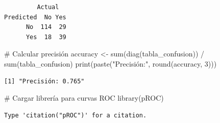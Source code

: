 \documentclass[
  letterpaper,
  DIV=11,
  numbers=noendperiod]{scrreprt}
\newenvironment{Shaded}{\begin{snugshade}}{\end{snugshade}}
\newcommand{\AttributeTok}[1]{\textcolor[rgb]{0.40,0.45,0.13}{#1}}
\newcommand{\CommentTok}[1]{\textcolor[rgb]{0.37,0.37,0.37}{#1}}
\newcommand{\DecValTok}[1]{\textcolor[rgb]{0.68,0.00,0.00}{#1}}
\newcommand{\FloatTok}[1]{\textcolor[rgb]{0.68,0.00,0.00}{#1}}
\newcommand{\FunctionTok}[1]{\textcolor[rgb]{0.28,0.35,0.67}{#1}}
\newcommand{\NormalTok}[1]{\textcolor[rgb]{0.00,0.23,0.31}{#1}}
\newcommand{\OtherTok}[1]{\textcolor[rgb]{0.00,0.23,0.31}{#1}}
\newcommand{\SpecialCharTok}[1]{\textcolor[rgb]{0.37,0.37,0.37}{#1}}
\newcommand{\StringTok}[1]{\textcolor[rgb]{0.13,0.47,0.30}{#1}}
\begin{document}
\begin{tcolorbox}
\begin{Shaded}
\end{Shaded}

\begin{verbatim}
         Actual
Predicted  No Yes
      No  114  29
      Yes  18  39
\end{verbatim}

\begin{Shaded}
\begin{Highlighting}[]
\CommentTok{\# Calcular precisión}
\NormalTok{accuracy }\OtherTok{\textless{}{-}} \FunctionTok{sum}\NormalTok{(}\FunctionTok{diag}\NormalTok{(tabla\_confusion)) }\SpecialCharTok{/} \FunctionTok{sum}\NormalTok{(tabla\_confusion)}
\FunctionTok{print}\NormalTok{(}\FunctionTok{paste}\NormalTok{(}\StringTok{"Precisión:"}\NormalTok{, }\FunctionTok{round}\NormalTok{(accuracy, }\DecValTok{3}\NormalTok{)))}
\end{Highlighting}
\end{Shaded}

\begin{verbatim}
[1] "Precisión: 0.765"
\end{verbatim}

\begin{Shaded}
\begin{Highlighting}[]
\CommentTok{\# Cargar librería para curvas ROC}
\FunctionTok{library}\NormalTok{(pROC)}
\end{Highlighting}
\end{Shaded}

\begin{verbatim}
Type 'citation("pROC")' for a citation.
\end{verbatim}


\end{tcolorbox}
\end{document}

